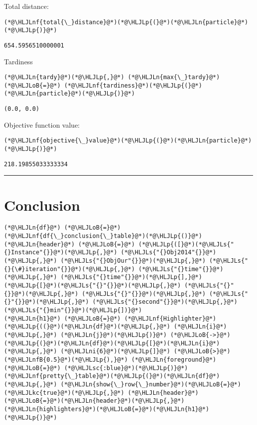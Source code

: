 \documentclass[12pt,a4paper]{article}
\newcommand{\HLJLkc}[1]{\textcolor[RGB]{59,151,46}{\textit{#1}}}
\newcommand{\HLJLn}[1]{#1}
\newcommand{\HLJLnf}[1]{\textcolor[RGB]{66,102,213}{#1}}
\newcommand{\HLJLs}[1]{\textcolor[RGB]{201,61,57}{#1}}
\newcommand{\HLJLsc}[1]{\textcolor[RGB]{201,61,57}{#1}}
\newcommand{\HLJLnfB}[1]{\textcolor[RGB]{59,151,46}{#1}}
\newcommand{\HLJLni}[1]{\textcolor[RGB]{59,151,46}{#1}}
\newcommand{\HLJLoB}[1]{\textcolor[RGB]{102,102,102}{\textbf{#1}}}
\newcommand{\HLJLp}[1]{#1}
\begin{document}
Total distance:


\begin{lstlisting}
(*@\HLJLnf{total{\_}distance}@*)(*@\HLJLp{(}@*)(*@\HLJLn{particle}@*)(*@\HLJLp{)}@*)
\end{lstlisting}

\begin{lstlisting}
654.5956510000001
\end{lstlisting}


Tardiness


\begin{lstlisting}
(*@\HLJLn{tardy}@*)(*@\HLJLp{,}@*) (*@\HLJLn{max{\_}tardy}@*) (*@\HLJLoB{=}@*) (*@\HLJLnf{tardiness}@*)(*@\HLJLp{(}@*)(*@\HLJLn{particle}@*)(*@\HLJLp{)}@*)
\end{lstlisting}

\begin{lstlisting}
(0.0, 0.0)
\end{lstlisting}


Objective function value:


\begin{lstlisting}
(*@\HLJLnf{objective{\_}value}@*)(*@\HLJLp{(}@*)(*@\HLJLn{particle}@*)(*@\HLJLp{)}@*)
\end{lstlisting}

\begin{lstlisting}
218.19855033333334
\end{lstlisting}


\rule{\textwidth}{1pt}
\section{Conclusion}

\begin{lstlisting}
(*@\HLJLn{df}@*) (*@\HLJLoB{=}@*) (*@\HLJLnf{df{\_}conclusion{\_}table}@*)(*@\HLJLp{()}@*)
(*@\HLJLn{header}@*) (*@\HLJLoB{=}@*) (*@\HLJLp{([}@*)(*@\HLJLs{"{}Instance"{}}@*)(*@\HLJLp{,}@*) (*@\HLJLs{"{}Obj2014"{}}@*)(*@\HLJLp{,}@*) (*@\HLJLs{"{}ObjOur"{}}@*)(*@\HLJLp{,}@*) (*@\HLJLs{"{}{\#}iteration"{}}@*)(*@\HLJLp{,}@*) (*@\HLJLs{"{}time"{}}@*)(*@\HLJLp{,}@*) (*@\HLJLs{"{}time"{}}@*)(*@\HLJLp{],}@*) 
(*@\HLJLp{[}@*)(*@\HLJLs{"{}"{}}@*)(*@\HLJLp{,}@*) (*@\HLJLs{"{}"{}}@*)(*@\HLJLp{,}@*) (*@\HLJLs{"{}"{}}@*)(*@\HLJLp{,}@*) (*@\HLJLs{"{}"{}}@*)(*@\HLJLp{,}@*) (*@\HLJLs{"{}second"{}}@*)(*@\HLJLp{,}@*) (*@\HLJLs{"{}min"{}}@*)(*@\HLJLp{])}@*)
(*@\HLJLn{h1}@*) (*@\HLJLoB{=}@*) (*@\HLJLnf{Highlighter}@*)(*@\HLJLp{((}@*)(*@\HLJLn{df}@*)(*@\HLJLp{,}@*) (*@\HLJLn{i}@*)(*@\HLJLp{,}@*) (*@\HLJLn{j}@*)(*@\HLJLp{)}@*) (*@\HLJLoB{->}@*) (*@\HLJLp{(}@*)(*@\HLJLn{df}@*)(*@\HLJLp{[}@*)(*@\HLJLn{i}@*)(*@\HLJLp{,}@*) (*@\HLJLni{6}@*)(*@\HLJLp{]}@*) (*@\HLJLoB{>}@*) (*@\HLJLnfB{0.5}@*)(*@\HLJLp{),}@*) (*@\HLJLn{foreground}@*) (*@\HLJLoB{=}@*) (*@\HLJLsc{:blue}@*)(*@\HLJLp{)}@*)
(*@\HLJLnf{pretty{\_}table}@*)(*@\HLJLp{(}@*)(*@\HLJLn{df}@*)(*@\HLJLp{,}@*) (*@\HLJLn{show{\_}row{\_}number}@*)(*@\HLJLoB{=}@*)(*@\HLJLkc{true}@*)(*@\HLJLp{,}@*) (*@\HLJLn{header}@*)(*@\HLJLoB{=}@*)(*@\HLJLn{header}@*)(*@\HLJLp{,}@*) (*@\HLJLn{highlighters}@*)(*@\HLJLoB{=}@*)(*@\HLJLn{h1}@*)(*@\HLJLp{)}@*)
\end{lstlisting}
\end{document}

